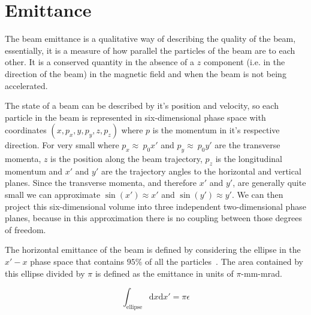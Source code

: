 \section{Emittance}

The beam emittance is a
qualitative way of describing the quality of the beam, essentially, it is a
measure of how parallel the particles of the beam are to each other.
It is a conserved
quantity in the absence of a \(z\) component (i.e. in the direction of the
beam) in the magnetic field and when the beam is not being accelerated.


The state of a beam can be described by it's position and velocity, so each
particle in the beam is represented in six-dimensional phase space with
coordinates \(\left(x,p_x,y,p_y,z,p_z\right)\) where \(p\) is the momentum in
it's respective direction. For very small 
where \(p_x\approx~p_0x'\) and
\(p_y\approx~p_0y'\) are the transverse momenta, \(z\) is the position along the
beam trajectory, \(p_z\) is the longitudinal momentum and \(x'\) and \(y'\) are
the trajectory angles to the horizontal and vertical planes. Since the
transverse momenta, and therefore \(x'\) and \(y'\), are generally quite small
we can approximate \(\sin\left(x'\right)\approx x'\) and
\(\sin\left(y'\right)\approx y'\). We can then project this six-dimensional
volume into three independent two-dimensional phase planes, because in this
approximation there is no coupling between those degrees of freedom.

The horizontal emittance of the beam is defined by considering the ellipse in
the \(x'-x\) phase space that contains \(95\%\) of all the
particles~\cite{buon1994beam}. The area contained by this ellipse divided by
\(\pi\) is defined as the emittance in units of \(\pi\)-mm-mrad.

\begin{equation}
	\int_{\text{ellipse}}\mathrm{d}x\mathrm{d}x' =\pi\epsilon
\end{equation}

